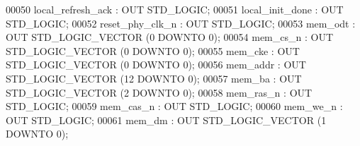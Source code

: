 \begin{DoxyCode}
{00050         local\_refresh\_ack   : \textcolor{keywordflow}{OUT} \textcolor{comment}{STD\_LOGIC};
00051         local\_init\_done : \textcolor{keywordflow}{OUT} \textcolor{comment}{STD\_LOGIC};
00052         \textcolor{vhdlchar}{reset_phy_clk_n} \textcolor{vhdlchar}{:} \textcolor{keywordflow}{OUT} \textcolor{comment}{STD\_LOGIC};
00053         \textcolor{vhdlchar}{mem_odt} \textcolor{vhdlchar}{:} \textcolor{keywordflow}{OUT} \textcolor{comment}{STD\_LOGIC\_VECTOR} \textcolor{vhdlchar}{(}\textcolor{vhdllogic}{}\textcolor{vhdllogic}{0} \textcolor{keywordflow}{DOWNTO} \textcolor{vhdllogic}{}\textcolor{vhdllogic}{0}\textcolor{vhdlchar}{)};
00054         \textcolor{vhdlchar}{mem_cs_n}    \textcolor{vhdlchar}{:} \textcolor{keywordflow}{OUT} \textcolor{comment}{STD\_LOGIC\_VECTOR} \textcolor{vhdlchar}{(}\textcolor{vhdllogic}{}\textcolor{vhdllogic}{0} \textcolor{keywordflow}{DOWNTO} \textcolor{vhdllogic}{}\textcolor{vhdllogic}{0}\textcolor{vhdlchar}{)};
00055         \textcolor{vhdlchar}{mem_cke} \textcolor{vhdlchar}{:} \textcolor{keywordflow}{OUT} \textcolor{comment}{STD\_LOGIC\_VECTOR} \textcolor{vhdlchar}{(}\textcolor{vhdllogic}{}\textcolor{vhdllogic}{0} \textcolor{keywordflow}{DOWNTO} \textcolor{vhdllogic}{}\textcolor{vhdllogic}{0}\textcolor{vhdlchar}{)};
00056         \textcolor{vhdlchar}{mem_addr}    \textcolor{vhdlchar}{:} \textcolor{keywordflow}{OUT} \textcolor{comment}{STD\_LOGIC\_VECTOR} \textcolor{vhdlchar}{(}\textcolor{vhdllogic}{}\textcolor{vhdllogic}{12} \textcolor{keywordflow}{DOWNTO} \textcolor{vhdllogic}{}\textcolor{vhdllogic}{0}\textcolor{vhdlchar}{)};
00057         \textcolor{vhdlchar}{mem_ba}  \textcolor{vhdlchar}{:} \textcolor{keywordflow}{OUT} \textcolor{comment}{STD\_LOGIC\_VECTOR} \textcolor{vhdlchar}{(}\textcolor{vhdllogic}{}\textcolor{vhdllogic}{2} \textcolor{keywordflow}{DOWNTO} \textcolor{vhdllogic}{}\textcolor{vhdllogic}{0}\textcolor{vhdlchar}{)};
00058         \textcolor{vhdlchar}{mem_ras_n}   \textcolor{vhdlchar}{:} \textcolor{keywordflow}{OUT} \textcolor{comment}{STD\_LOGIC};
00059         \textcolor{vhdlchar}{mem_cas_n}   \textcolor{vhdlchar}{:} \textcolor{keywordflow}{OUT} \textcolor{comment}{STD\_LOGIC};
00060         \textcolor{vhdlchar}{mem_we_n}    \textcolor{vhdlchar}{:} \textcolor{keywordflow}{OUT} \textcolor{comment}{STD\_LOGIC};
00061         \textcolor{vhdlchar}{mem_dm}  \textcolor{vhdlchar}{:} \textcolor{keywordflow}{OUT} \textcolor{comment}{STD\_LOGIC\_VECTOR} \textcolor{vhdlchar}{(}\textcolor{vhdllogic}{}\textcolor{vhdllogic}{1} \textcolor{keywordflow}{DOWNTO} \textcolor{vhdllogic}{}\textcolor{vhdllogic}{0}\textcolor{vhdlchar}{)};
}
\end{DoxyCode}
